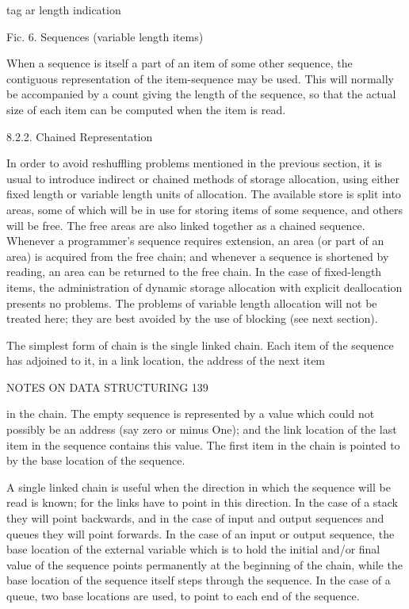 {{{{				tag ar length indication
				
				Fic. 6. Sequences (variable length items)
				
				When a sequence is itself a part of an item of some other sequence, the contiguous representation of the item-sequence may be used. This will normally be accompanied by a count giving the length of the sequence, so that the actual size of each item can be computed when the item is read.
				
				8.2.2. Chained Representation
				
				In order to avoid reshuffling problems mentioned in the previous section, it is usual to introduce indirect or chained methods of storage allocation, using either fixed length or variable length units of allocation. The available store is split into areas, some of which will be in use for storing items of some sequence, and others will be free. The free areas are also linked together as a chained sequence. Whenever a programmer’s sequence requires extension, an area (or part of an area) is acquired from the free chain; and whenever a sequence is shortened by reading, an area can be returned to the free chain. In the case of fixed-length items, the administration of dynamic storage allocation with explicit deallocation presents no problems. The problems of variable length allocation will not be treated here; they are best avoided by the use of blocking (see next section).
				
				The simplest form of chain is the single linked chain. Each item of the sequence has adjoined to it, in a link location, the address of the next item
				
				NOTES ON DATA STRUCTURING 139
				
				in the chain. The empty sequence is represented by a value which could not possibly be an address (say zero or minus One); and the link location of the last item in the sequence contains this value. The first item in the chain is pointed to by the base location of the sequence.
				
				A single linked chain is useful when the direction in which the sequence will be read is known; for the links have to point in this direction. In the case of a stack they will point backwards, and in the case of input and output sequences and queues they will point forwards. In the case of an input or output sequence, the base location of the external variable which is to hold the initial and/or final value of the sequence points permanently at the beginning of the chain, while the base location of the sequence itself steps through the sequence. In the case of a queue, two base locations are used, to point to each end of the sequence.
				
}}}}
